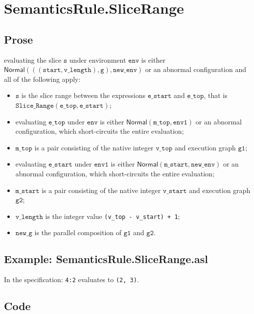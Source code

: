 \documentclass{book}
\newcommand\ProseOrAbnormal[0]{or an abnormal configuration, which short-circuits the entire evaluation}
\newcommand\Normal[0]{\textsf{Normal}}
\newcommand\newenv[0]{\texttt{new\_env}}
\newcommand\env[0]{\texttt{env}}
\newcommand\envone[0]{\texttt{env1}}
\newcommand\vg[0]{\texttt{g}}
\newcommand\newg[0]{\texttt{new\_g}}
\newcommand\vs[0]{\texttt{s}}
\newcommand\vgone[0]{\texttt{g1}}
\newcommand\vgtwo[0]{\texttt{g2}}
\newcommand\start[0]{\texttt{start}}
\newcommand\mstart[0]{\texttt{m\_start}}
\newcommand\vstart[0]{\texttt{v\_start}}
\newcommand\estart[0]{\texttt{e\_start}}
\newcommand\vlength[0]{\texttt{v\_length}}
\newcommand\etop[0]{\texttt{e\_top}}
\newcommand\vvtop[0]{\texttt{v\_top}}
\newcommand\mtop[0]{\texttt{m\_top}}
\begin{document}

\section{SemanticsRule.SliceRange \label{sec:SemanticsRule.SliceRange}}
  \subsection{Prose}
  evaluating the slice $\vs$ under environment $\env$ is either \\
  $\Normal(((\start, \vlength), \vg), \newenv)$
  or an abnormal configuration and all of the following apply:
  \begin{itemize}
    \item $\vs$ is the slice range between the
      expressions $\estart$ and $\etop$, that is $\texttt{Slice\_Range}(\etop, \estart)$;
    \item evaluating $\etop$ under $\env$ is either $\Normal(\mtop, \envone)$ \ProseOrAbnormal;
    \item $\mtop$ is a pair consisting of the native integer $\vvtop$ and execution graph $\vgone$;
    \item evaluating $\estart$ under $\envone$ is either $\Normal(\mstart, \newenv)$ \ProseOrAbnormal;
    \item $\mstart$ is a pair consisting of the native integer $\vstart$ and execution graph $\vgtwo$;
    \item $\vlength$ is the integer value \texttt{(v\_top - v\_start) + 1};
    \item $\newg$ is the parallel composition of $\vgone$ and $\vgtwo$.
  \end{itemize}

  \subsection{Example: SemanticsRule.SliceRange.asl}
  In the specification:
  \texttt{4:2} evaluates to \texttt{(2, 3)}.

  \subsection{Code}
\end{document}
